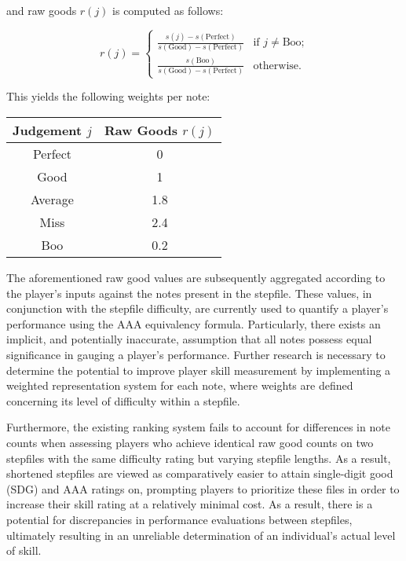 and raw goods $r(j)$ is computed as follows:

\begin{equation*}
	r(j) = 
	\begin{cases}
		\displaystyle \frac{s(j) - s(\text{Perfect})}{s(\text{Good}) - s(\text{Perfect})}
		  &   
		\text{if $j \neq \text{Boo}$;}
		\\[10pt]
		\displaystyle \frac{s(\text{Boo})}{s(\text{Good}) - s(\text{Perfect})}
		  &   
		\text{otherwise.}
	\end{cases}
\end{equation*}

This yields the following weights per note:

\begin{center}
	\begin{tabular}{c@{\hskip 5mm}c}
		\hspace{5mm} \textbf{Judgement} $j$ \hspace{5mm} & \textbf{Raw Goods} $r(j)$ \\
            \hline
		Perfect                               & 0                         \\
		Good                                  & 1                         \\
		Average                               & 1.8                       \\
		Miss                                  & 2.4                       \\
		Boo                                   & 0.2                       \\
	\end{tabular}
\end{center}

The aforementioned raw good values are subsequently aggregated according to the player's inputs against the notes present in the stepfile. These values, in conjunction with the stepfile difficulty, are currently used to quantify a player's performance using the AAA equivalency formula. Particularly, there exists an implicit, and potentially inaccurate, assumption that all notes possess equal significance in gauging a player's performance. Further research is necessary to determine the potential to improve player skill measurement by implementing a weighted representation system for each note, where weights are defined concerning its level of difficulty within a stepfile. 

\vspace{2mm}

Furthermore, the existing ranking system fails to account for differences in note counts when assessing players who achieve identical raw good counts on two stepfiles with the same difficulty rating but varying stepfile lengths. As a result, shortened stepfiles are viewed as comparatively easier to attain single-digit good (SDG) and AAA ratings on, prompting players to prioritize these files in order to increase their skill rating at a relatively minimal cost. As a result, there is a potential for discrepancies in performance evaluations between stepfiles, ultimately resulting in an unreliable determination of an individual's actual level of skill.

